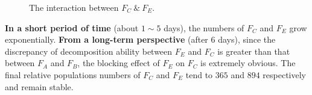 \begin{figure}[H]
  \centering
  \caption{The interaction between $F_C\ \&\ F_E$.}
\end{figure}
\par
\textbf{In a short period of time} (about $1\sim 5$ days), the numbers of $F_C$ and $F_E$ grow exponentially. \textbf{From a long-term perspective} (after $6$ days), since the discrepancy of decomposition ability between $F_E$ and $F_C$ is greater than that between $F_A$ and $F_B$, the blocking effect of $F_E$ on $F_C$ is extremely obvious. The final relative populations numbers of $F_C$ and $F_E$ tend to $365$ and $894$ respectively and remain stable.